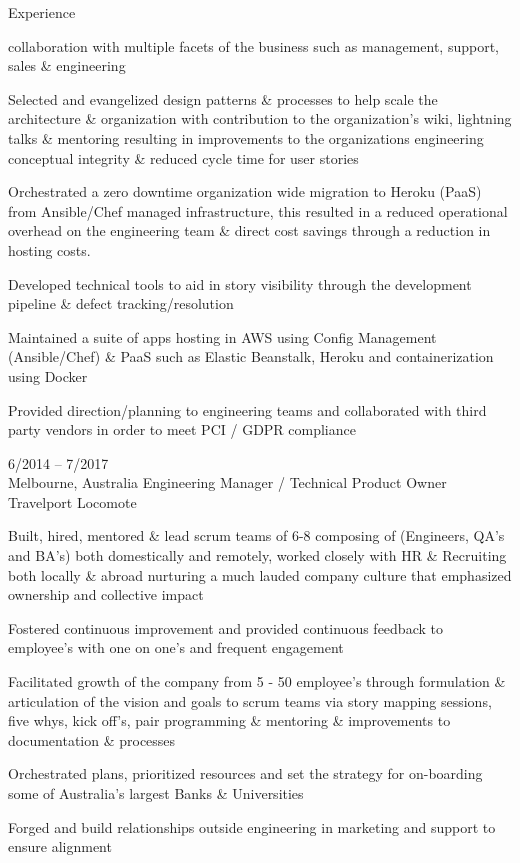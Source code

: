 \documentclass[9pt]{developercv} %
\begin{document}
\begin{cvsect}{Experience}
\begin{entrylist}
{      collaboration with multiple facets of the business such as management, support, sales \& engineering
  \par\medskip Selected and evangelized design patterns \& processes to help scale
    the architecture \& organization with contribution to the organization's wiki,
    lightning talks \& mentoring resulting in improvements to the organizations engineering conceptual integrity \& reduced cycle time for user stories
  \par\medskip Orchestrated a zero downtime organization wide migration to Heroku (PaaS) from Ansible/Chef managed infrastructure, this resulted in a reduced operational overhead on the engineering team \& direct cost savings through a reduction in hosting costs.
  \par\medskip Developed technical tools to aid in story visibility through the
      development pipeline \& defect tracking/resolution 
  \par\medskip Maintained a suite of apps hosting in AWS using Config Management
      (Ansible/Chef) \& PaaS such as Elastic Beanstalk, Heroku and
      containerization using Docker
  \par\medskip Provided direction/planning to engineering teams and collaborated with third party vendors in order to meet PCI / GDPR compliance
      }
    \entry
      {6/2014 -- 7/2017\\\footnotesize{Melbourne, Australia}}
      {Engineering Manager / Technical Product Owner}
      {Travelport Locomote}
      {Built, hired, mentored \& lead scrum teams of 6-8  composing of (Engineers,
      QA’s and BA’s) both domestically and remotely, worked closely with HR \&
      Recruiting both locally \& abroad nurturing a much lauded company culture
      that emphasized ownership and collective impact
      \par\medskip Fostered continuous improvement and provided continuous feedback to employee’s with one on one’s and frequent engagement
      \par\medskip Facilitated growth of the company from 5 - 50 employee’s through formulation \& articulation of the vision and goals to scrum teams via story mapping sessions, five whys, kick off's, pair programming \& mentoring \& improvements to documentation \& processes
      \par\medskip Orchestrated plans, prioritized resources and set the strategy for on-boarding some of Australia’s largest Banks \& Universities
      \par\medskip Forged and build relationships outside engineering in marketing and support to ensure alignment
}
\end{entrylist}
\end{cvsect}
\end{document}
